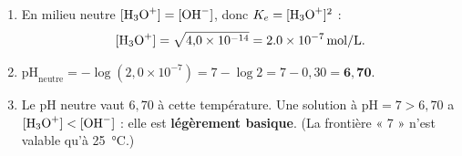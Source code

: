 \documentclass[11pt,a4paper]{article}
\begin{document}
\begin{corrige}
\begin{enumerate}[label=\alph*)]
  \item En milieu neutre $[\ce{H3O+}]=[\ce{OH-}]$, donc $K_e = [\ce{H3O+}]^2$ :
        \[ [\ce{H3O+}] = \sqrt{4{,}0\times10^{-14}} = \qty{2,0e-7}{mol\per L}. \]
  \item $\mathrm{pH}_{\text{neutre}} = -\log(2{,}0\times10^{-7}) = 7 - \log 2 = 7 - 0{,}30 = \mathbf{6{,}70}$.
  \item Le pH neutre vaut $6{,}70$ à cette température. Une solution à $\mathrm{pH}=7 > 6{,}70$ a
        $[\ce{H3O+}] < [\ce{OH-}]$ : elle est \textbf{légèrement basique}. (La frontière « 7 » n'est valable
        qu'à \qty{25}{\celsius}.)
\end{enumerate}
\end{corrige}
\end{document}
